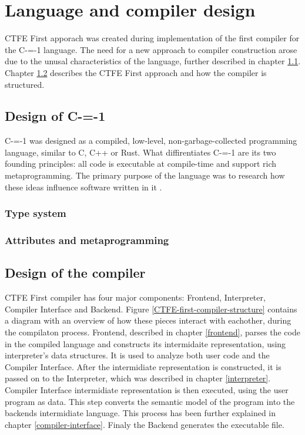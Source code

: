 \section{Language and compiler design}

CTFE First apporach was created during implementation of the first compiler for the C-=-1 language\cite{grabski2022compilation}.
The need for a new approach to compiler construction arose due to the unusal characteristics of the language, further described in chapter \ref{language-design}.
Chapter \ref{compiler-design} describes the CTFE First approach and how the compiler is structured. 

\subsection{Design of C-=-1}
\label{language-design}

C-=-1 was designed as a compiled, low-level, non-garbage-collected programming language, similar to C, C++ or Rust.
What diffirentiates C-=-1 are its two founding principles: all code is executable at compile-time and support rich metaprogramming.
The primary purpose of the language was to research how these ideas influence software written in it \cite{grabski2022compilation}.

\subsubsection{Type system}

\subsubsection{Attributes and metaprogramming}

\subsection{Design of the compiler}
\label{compiler-design}

CTFE First compiler has four major components: Frontend, Interpreter, Compiler Interface and Backend.
Figure \ref{CTFE-first-compiler-structure} contains a diagram with an overview of how these pieces interact with eachother, during the compilaton process.
Frontend, described in chapter \ref{frontend}, parses the code in the compiled language and constructs its intermidaite representation, using interpreter's data structures.
It is used to analyze both user code and the Compiler Interface.
After the intermidiate representation is constructed, it is passed on to the Interpreter, which was described in chapter \ref{interpreter}.
Compiler Interface intermidiate representation is then executed, using the user program as data. 
This step converts the semantic model of the program into the backends intermidiate language.
This process has been further explained in chapter \ref{compiler-interface}.
Finaly the Backend generates the executable file.

